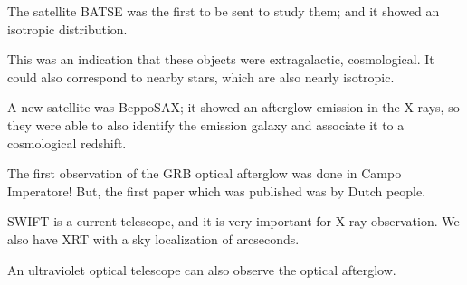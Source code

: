 \documentclass[main.tex]{subfiles}
\begin{document}
The satellite BATSE was the first to be sent to study them; 
and it showed an isotropic distribution. 

This was an indication that these objects were extragalactic, cosmological. 
It could also correspond to nearby stars, which are also nearly isotropic. 

A new satellite was BeppoSAX; it showed an afterglow emission in the X-rays, 
so they were able to also identify the emission galaxy and associate it to a cosmological redshift. 

The first observation of the GRB optical afterglow was done in Campo Imperatore! 
But, the first paper which was published was by Dutch people. 

SWIFT is a current telescope, and it is very important for X-ray observation. 
We also have XRT with a sky localization of arcseconds. 

An ultraviolet optical telescope can also observe the optical afterglow. 
\end{document}
